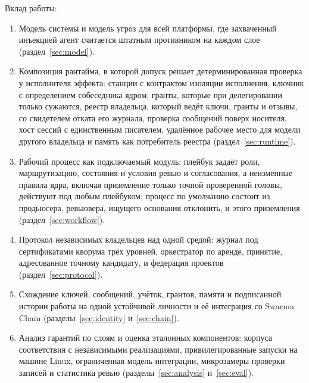 \documentclass[10pt,a4paper]{article}
\begin{document}
Вклад работы:
\begin{enumerate}
\item Модель системы и модель угроз для всей платформы, где захваченный инъекцией агент считается штатным противником на каждом слое (раздел~\ref{sec:model}).
\item Композиция рантайма, в которой допуск решает детерминированная проверка у исполнителя эффекта: станции с контрактом изоляции исполнения, ключник с определением собеседника ядром, гранты, которые при делегировании только сужаются, реестр владельца, который ведёт ключи, гранты и отзывы, со свидетелем отката его журнала, проверка сообщений поверх носителя, хост сессий с единственным писателем, удалённое рабочее место для модели другого владельца и память как потребитель реестра (раздел~\ref{sec:runtime}).
\item Рабочий процесс как подключаемый модуль: плейбук задаёт роли, маршрутизацию, состояния и условия ревью и согласования, а неизменные правила ядра, включая приземление только точной проверенной головы, действуют под любым плейбуком; процесс по умолчанию состоит из продьюсера, ревьювера, ищущего основания отклонить, и этого приземления (раздел~\ref{sec:workflow}).
\item Протокол независимых владельцев над одной средой: журнал под сертификатами кворума трёх уровней, оркестратор по аренде, принятие, адресованное точному кандидату, и федерация проектов (раздел~\ref{sec:protocol}).
\item Схождение ключей, сообщений, учёток, грантов, памяти и подписанной истории работы на одной устойчивой личности и её интеграция со Swarma Chain (разделы~\ref{sec:identity} и~\ref{sec:chain}).
\item Анализ гарантий по слоям и оценка эталонных компонентов: корпуса соответствия с независимыми реализациями, привилегированные запуски на машине Linux, ограниченная модель интеграции, микрозамеры проверки записей и статистика ревью (разделы~\ref{sec:analysis} и~\ref{sec:eval}).
\end{enumerate}
\end{document}
